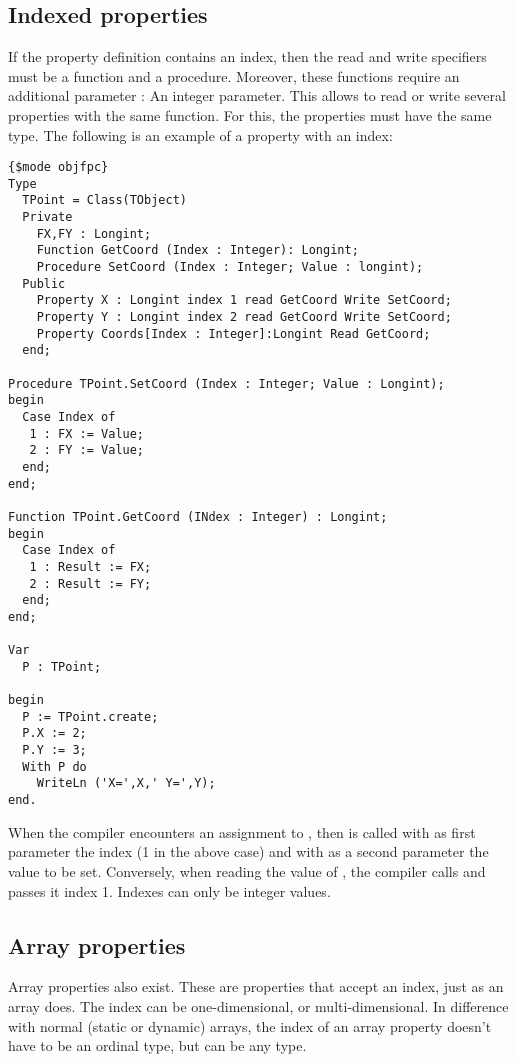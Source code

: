 \subsection{Indexed properties}
If the property definition contains an index,  then the read and write
specifiers must be a function and a procedure. Moreover, these functions
require an additional parameter : An integer parameter. This allows to read
or write several properties with the same function. For this, the properties
must have the same type.
The following is an example of a property with an index:
\begin{verbatim}
{$mode objfpc}
Type 
  TPoint = Class(TObject)
  Private
    FX,FY : Longint;
    Function GetCoord (Index : Integer): Longint;
    Procedure SetCoord (Index : Integer; Value : longint);
  Public
    Property X : Longint index 1 read GetCoord Write SetCoord;
    Property Y : Longint index 2 read GetCoord Write SetCoord;
    Property Coords[Index : Integer]:Longint Read GetCoord;
  end;

Procedure TPoint.SetCoord (Index : Integer; Value : Longint);
begin
  Case Index of
   1 : FX := Value;
   2 : FY := Value;
  end;
end;

Function TPoint.GetCoord (INdex : Integer) : Longint;
begin
  Case Index of
   1 : Result := FX;
   2 : Result := FY;
  end;
end;

Var 
  P : TPoint;

begin
  P := TPoint.create;
  P.X := 2;
  P.Y := 3;
  With P do
    WriteLn ('X=',X,' Y=',Y);
end.
\end{verbatim}
When the compiler encounters an assignment to , then 
is called with as first parameter the index (1 in the above case) and with
as a second parameter the value to be set.
Conversely, when reading the value of , the compiler calls
 and passes it index 1.
Indexes can only be integer values.

\subsection{Array properties}
Array properties also exist. These are properties that accept an
index, just as an array does. The index can be one-dimensional, or multi-dimensional.
In difference with normal (static or dynamic) arrays, the index of an array property 
doesn't have to be an ordinal type, but can be any type.

